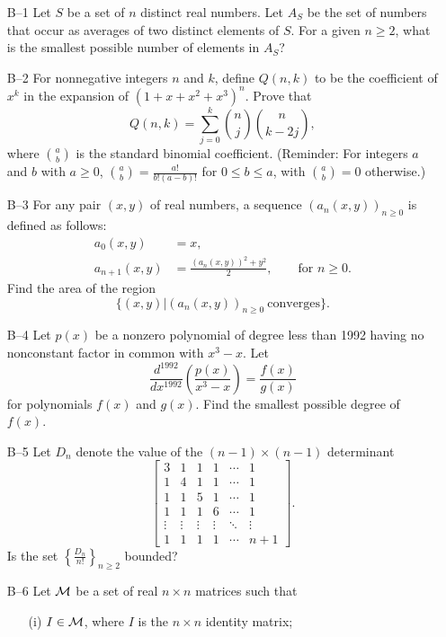 \documentclass[amssymb,twocolumn,pra,10pt,aps]{revtex4-1}
\begin{document}
\begin{itemize}
\item[B--1] Let $S$ be a set of $n$ distinct real numbers. Let $A_S$ be
the set of numbers that occur as averages of two distinct elements of
$S$. For a given $n \geq 2$, what is the smallest possible number of
elements in $A_S$?

\item[B--2] For nonnegative integers $n$ and $k$, define $Q(n, k)$ to be
the coefficient of $x^k$ in the expansion of $(1 + x + x^2 + x^3)^n$.
Prove that
\[
Q(n, k) = \sum_{j=0}^k \binom{n}{j} \binom{n}{k-2j},
\]
where $\binom{a}{b}$ is the standard binomial coefficient. (Reminder: For
integers $a$ and $b$ with $a \geq 0$, $\binom{a}{b} =
\frac{a!}{b!(a-b)!}$ for $0 \leq b \leq a$, with $\binom{a}{b} = 0$ otherwise.)

\item[B--3] For any pair $(x, y)$ of real numbers, a sequence
$(a_n(x,y))_{n\geq 0}$ is defined as follows:
\begin{align*}
a_0(x, y) &= x, \\
a_{n+1}(x, y) &= \frac{(a_n(x, y))^2 + y^2}{2}, \qquad \mbox{for $n \geq 0$}.
\end{align*}
Find the area of the region
\[
\{ (x, y) | (a_n(x, y))_{n \geq 0}\ \mbox{converges}\}.
\]

\item[B--4] Let $p(x)$ be a nonzero polynomial of degree less than 1992
having no nonconstant factor in common with $x^3 - x$. Let
\[
\frac{d^{1992}}{dx^{1992}} \left( \frac{p(x)}{x^3 - x} \right) =
\frac{f(x)}{g(x)}
\]
for polynomials $f(x)$ and $g(x)$. Find the smallest possible degree of $f(x)$.

\item[B--5] Let $D_n$ denote the value of the $(n-1) \times (n-1)$ determinant
\[
\left[
\begin{array}{cccccc}
3 & 1 & 1 & 1 & \cdots & 1 \\
1 & 4 & 1 & 1 & \cdots & 1 \\
1 & 1 & 5 & 1 & \cdots & 1 \\
1 & 1 & 1 & 6 & \cdots & 1 \\
\vdots & \vdots & \vdots & \vdots & \ddots & \vdots \\
1 & 1 & 1 & 1 & \cdots & n+1
\end{array}
\right].
\]
Is the set $\left\{ \frac{D_n}{n!} \right\}_{n \geq 2}$ bounded?

\item[B--6] Let ${\mathcal{M}}$ be a set of real $n \times n$ matrices such that
\begin{itemize}
\item[(i)] $I \in {\mathcal{M}}$, where $I$ is the $n \times n$ identity matrix;


\end{itemize}
\end{itemize}
\end{document}
